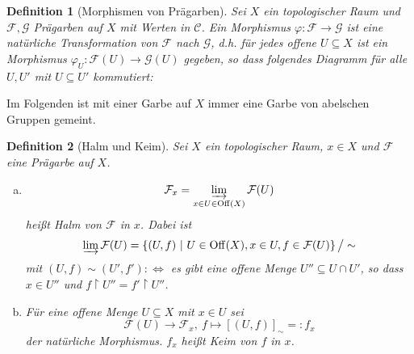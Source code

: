 \documentclass[a4paper,oneside]{scrbook}
\theoremstyle{break}
\newtheorem{Def}{Definition}[section]
\theoremstyle{nonumberbreak}
\theoremstyle{nonumberplain}
\theoremstyle{break}
\newcommand{\Off}{%
	\ensuremath{\operatorname{Off}}%
}
\renewcommand{\phi}{%
	\ensuremath{\varphi}%
}
\newcommand{\directlim}{%
	\ensuremath{\varinjlim}%
}
\begin{document}
\begin{Def}[Morphismen von Prägarben]
	\label{def:sheaf_morphism}
	Sei $X$ ein topologischer Raum und $\mathcal{F}, \mathcal{G}$ Prägarben auf $X$ mit Werten in $\mathcal{C}$.
	Ein Morphismus $\phi\colon \mathcal{F} \to \mathcal{G}$ ist eine natürliche Transformation von $\mathcal{F}$ nach $\mathcal{G}$, d.h.
	für jedes offene $U \subseteq X$ ist ein Morphismus $\phi_U\colon \mathcal{F}(U) \to \mathcal{G}(U)$ gegeben, so dass folgendes Diagramm für alle $U,U'$ mit $U \subseteq U'$ kommutiert:
	\begin{center}
	\end{center}

\end{Def}



Im Folgenden ist mit einer Garbe auf $X$ immer eine Garbe von abelschen Gruppen gemeint.



\begin{Def}[Halm und Keim]
	\label{def:stalk_germ}
	Sei $X$ ein topologischer Raum, $x\in X$ und $\mathcal{F}$ eine Prägarbe auf $X$.
	\begin{enumerate}[(a)]
		\item \[\mathcal{F}_{x} = \directlim_{x\in U \in \Off(X)} \mathcal{F}(U)\] 
		heißt \emph{Halm} von $\mathcal{F}$ in $x$. Dabei ist
		\[ \directlim \mathcal{F}(U) = \left\{ (U,f)\ |\ U \in \Off(X), x \in U, f \in \mathcal{F}(U) \right\} \big/ \sim \]
		mit $(U,f) \sim (U',f') :\Leftrightarrow $ es gibt eine offene Menge $U'' \subseteq U \cap U'$, so dass $x \in U''$ und $f \restriction U'' = f'\restriction U''$.
		\item Für eine offene Menge $U \subseteq X$ mit $x\in U$ sei
		\[ \mathcal{F}(U) \to \mathcal{F}_{x},\ f \mapsto [ (U,f) ]_{\sim} =: f_x \]
		der natürliche Morphismus. $f_x$ heißt \emph{Keim} von $f$ in $x$.
	\end{enumerate}
\end{Def}
\end{document}

